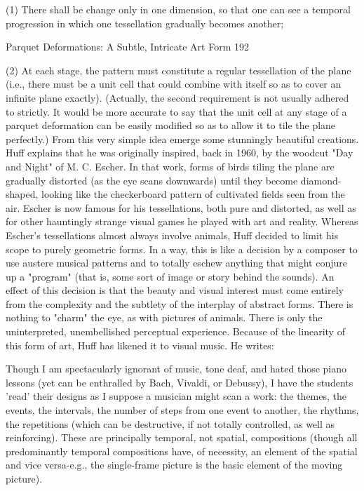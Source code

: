        (1) There shall be change only in one dimension, so that one can see a temporal
progression in which one tessellation gradually becomes another;




Parquet Deformations: A Subtle, Intricate Art Form                                       192

         (2) At each stage, the pattern must constitute a regular tessellation of the plane
(i.e., there must be a unit cell that could combine with itself so as to cover an infinite
plane exactly).
         (Actually, the second requirement is not usually adhered to strictly. It would be
more accurate to say that the unit cell at any stage of a parquet deformation can be easily
modified so as to allow it to tile the plane perfectly.)
         From this very simple idea emerge some stunningly beautiful creations. Huff
explains that he was originally inspired, back in 1960, by the woodcut "Day and Night"
of M. C. Escher. In that work, forms of birds tiling the plane are gradually distorted (as
the eye scans downwards) until they become diamond-shaped, looking like the
checkerboard pattern of cultivated fields seen from the air. Escher is now famous for his
tessellations, both pure and distorted, as well as for other hauntingly strange visual games
he played with art and reality.
         Whereas Escher's tessellations almost always involve animals, Huff decided to
limit his scope to purely geometric forms. In a way, this is like a decision by a composer
to use austere musical patterns and to totally eschew anything that might conjure up a
"program" (that is, some sort of image or story behind the sounds). An effect of this
decision is that the beauty and visual interest must come entirely from the complexity and
the subtlety of the interplay of abstract forms. There is nothing to "charm" the eye, as
with pictures of animals. There is only the uninterpreted, unembellished perceptual
experience.
         Because of the linearity of this form of art, Huff has likened it to visual music. He
writes:

   Though I am spectacularly ignorant of music, tone deaf, and hated those piano
   lessons (yet can be enthralled by Bach, Vivaldi, or Debussy), I have the students
   'read' their designs as I suppose a musician might scan a work: the themes, the
   events, the intervals, the number of steps from one event to another, the rhythms,
   the repetitions (which can be destructive, if not totally controlled, as well as
   reinforcing). These are principally temporal, not spatial, compositions (though all
   predominantly temporal compositions have, of necessity, an element of the spatial
   and vice versa-e.g., the single-frame picture is the basic element of the moving
   picture).

